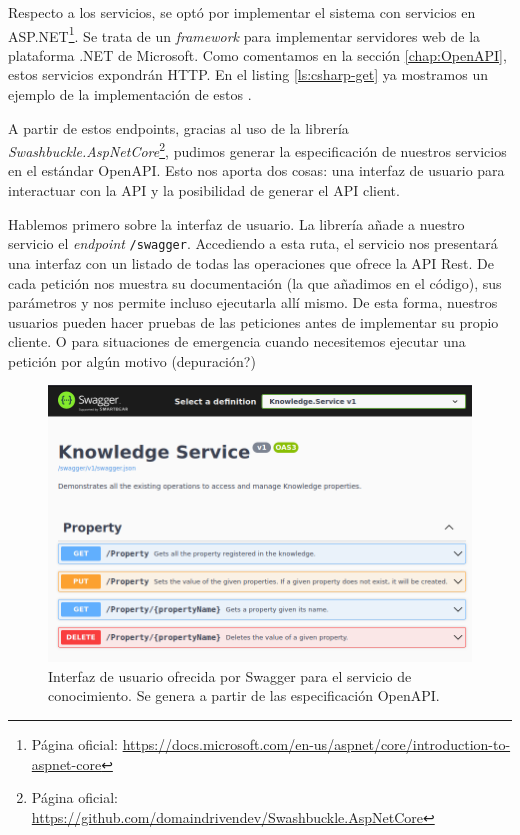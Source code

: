 Respecto a los servicios, se optó por implementar el sistema con servicios en ASP.NET\footnote{Página oficial: \url{https://docs.microsoft.com/en-us/aspnet/core/introduction-to-aspnet-core}}. Se trata de un \emph{framework} para implementar servidores web de la plataforma .NET de Microsoft. Como comentamos en la sección \ref{chap:OpenAPI}, estos servicios expondrán  HTTP. En el listing \ref{ls:csharp-get} ya mostramos un ejemplo de la implementación de estos .

A partir de estos endpoints, gracias al uso de la librería \emph{Swashbuckle.AspNetCore}\footnote{Página oficial: \url{https://github.com/domaindrivendev/Swashbuckle.AspNetCore}}, pudimos generar la especificación de nuestros servicios en el estándar OpenAPI. Esto nos aporta dos cosas: una interfaz de usuario para interactuar con la API y la posibilidad de generar el API client.

Hablemos primero sobre la interfaz de usuario. La librería añade a nuestro servicio el \emph{endpoint} \texttt{/swagger}. Accediendo a esta ruta, el servicio nos presentará una interfaz con un listado de todas las operaciones que ofrece la API Rest. De cada petición nos muestra su documentación (la que añadimos en el código), sus parámetros y nos permite incluso ejecutarla allí mismo. De esta forma, nuestros usuarios pueden hacer pruebas de las peticiones antes de implementar su propio cliente. O para situaciones de emergencia cuando necesitemos ejecutar una petición por algún motivo (depuración?)

\begin{figure}[htb]
  \centering
  \includegraphics[scale=1.5]{cap_implementacion/images/swagger-knowledge-ui}
  \caption{Interfaz de usuario ofrecida por Swagger para el servicio de conocimiento. Se genera a partir de las especificación OpenAPI.}
  \label{fig:swagger-knowledge-ui}
\end{figure}


